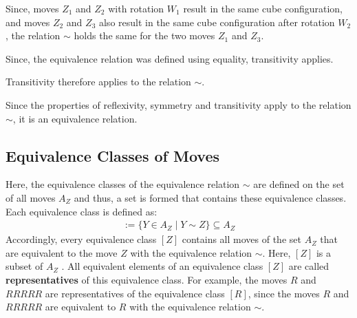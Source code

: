 \begin{description}
Since, moves $Z_1$ and $Z_2$ with rotation $W_1$ result in the same cube configuration, and moves $Z_2$ and $Z_3$ also result in the same cube configuration after rotation $W_2$, the relation $\sim$ holds the same for the two moves $Z_1$ and $Z_3$.

Since, the equivalence relation was defined using equality, transitivity applies.


Transitivity therefore applies to the relation $\sim$.

\end{description}

Since the properties of reflexivity, symmetry and transitivity apply to the relation $\sim$, it is an equivalence relation.

\subsection{Equivalence Classes of Moves}
\label{Section_EquivalenceClassesOfMoves}

 Here, the equivalence classes of the equivalence relation $\sim$ are defined on the set of all moves $A_Z$ and thus, a set is formed that contains these equivalence classes. Each equivalence class is defined as:
\begin{align*}
[Z] := \{ Y \in A_Z \mid Y \sim Z \} \subseteq A_Z
\end{align*}
Accordingly, every equivalence class $[Z]$ contains all moves of the set $A_Z$ that are equivalent to the move $Z$ with the equivalence relation $\sim$. Here, $[Z]$ is a subset of $A_Z$ . All equivalent elements of an equivalence class $[Z]$ are called \textbf{representatives} of this equivalence class. For example, the moves $R$ and $RRRRR$ are representatives of the equivalence class $[R]$, since the moves $R$ and $RRRRR$ are equivalent to $R$ with the equivalence relation $\sim$.

